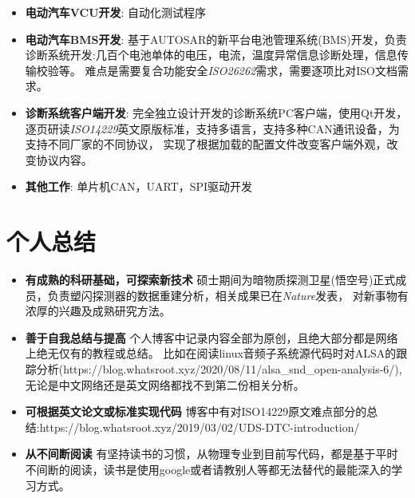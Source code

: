 \documentclass{resume}
\begin{document}
\begin{itemize}[parsep=0.2ex]
  \item \textbf{电动汽车VCU开发}: 自动化测试程序
\end{itemize}

\begin{itemize}[parsep=0.2ex]
    \item \textbf{电动汽车BMS开发}: \newline
    基于AUTOSAR的新平台电池管理系统(BMS)开发，负责诊断系统开发:几百个电池单体的电压，电流，温度异常信息诊断处理，信息传输校验等。
    难点是需要复合功能安全\emph{ISO26262}需求，需要逐项比对ISO文档需求。
  \item \textbf{诊断系统客户端开发}: \newline
    完全独立设计开发的诊断系统PC客户端，使用Qt开发，逐页研读\emph{ISO14229}英文原版标准，支持多语言，支持多种CAN通讯设备，为支持不同厂家的不同协议，
    实现了根据加载的配置文件改变客户端外观，改变协议内容。
  \item \textbf{其他工作}: \newline
    单片机CAN，UART，SPI驱动开发
\end{itemize}

\section{个人总结}
\begin{itemize}[parsep=0.2ex]
  \item \textbf{有成熟的科研基础，可探索新技术}\newline
    硕士期间为暗物质探测卫星(悟空号)正式成员，负责塑闪探测器的数据重建分析，相关成果已在\emph{Nature}发表，
    对新事物有浓厚的兴趣及成熟研究方法。
  \item \textbf{善于自我总结与提高}\newline
  个人博客中记录内容全部为原创，且绝大部分都是网络上绝无仅有的教程或总结。
  比如在阅读linux音频子系统源代码时对ALSA的跟踪分析(https://blog.whatsroot.xyz/2020/08/11/alsa\_snd\_open-analysis-6/),无论是中文网络还是英文网络都找不到第二份相关分析。
  \item \textbf{可根据英文论文或标准实现代码}\newline
  博客中有对ISO14229原文难点部分的总结:https://blog.whatsroot.xyz/2019/03/02/UDS-DTC-introduction/
  \item \textbf{从不间断阅读}\newline
  有坚持读书的习惯，从物理专业到目前写代码，都是基于平时不间断的阅读，读书是使用google或者请教别人等都无法替代的最能深入的学习方式。
\end{itemize}
\end{document}
